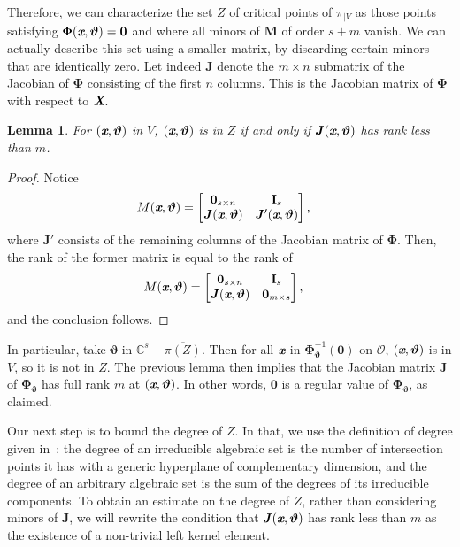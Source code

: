 \documentclass[a4paper]{article}
\def\sO{\mathscr{O}}
\def\Xb{\textit{\textbf{X}}}
\def\thetab{\bm{\vartheta}}
\def\xb{\textit{\textbf{x}}}
\def\dt{s}
\def\C{\mathbb{C}}
\def\bbm{\begin{bmatrix}}
\def\ebm{\end{bmatrix}}
\newtheorem{lemma}[theorem]{Lemma}
\begin{document}
    Therefore, we can characterize the set $Z$ of critical points of
    $\pi_{|V}$ as those points satisfying $\bm\Phi(\xb,\thetab)=\bm 0$ and
    where all minors of $\bm M$ of order $\dt+m$ vanish. We can actually
    describe this set using a smaller matrix, by discarding certain minors
    that are identically zero. Let indeed $\bm J$ denote the $m \times n$
    submatrix of the Jacobian of $\bm\Phi$ consisting of the first $n$
    columns. This is the Jacobian matrix of $\bm \Phi$ with respect to $\Xb$.
    \begin{lemma} 
      For $(\xb,\thetab)$ in $V$, $(\xb,\thetab)$ is in $Z$ if and only if
      $\bm J(\xb,\thetab)$ has rank less than $m$.
    \end{lemma}
    \begin{proof}
    Notice 
    \begin{align*}
    M(\xb,\thetab)&= 
    \bbm 
    \textbf{0}_{\dt \times n} &\textbf{I}_{\dt} \\
    \bm J(\xb,\thetab)     &\bm J'(\xb,\thetab)
    \ebm,
    \end{align*}
    where $\bm J'$ consists of the remaining columns of the Jacobian matrix of
    $\bm\Phi$.  Then, the rank of the former matrix is equal to the rank
    of
    \begin{align*}
    M(\xb,\thetab)&= 
    \bbm 
    \textbf{0}_{\dt \times n} &\textbf{I}_{\dt} \\
    \bm J(\xb,\thetab)     & \bm 0_{m \times s}
    \ebm,
    \end{align*}
    and the conclusion follows.
    \end{proof}

    In particular, take $\thetab$ in $\C^\dt - \overline{\pi(Z)}$.
    Then for all $\xb$ in $\bm \Phi_{\thetab}^{-1}(\bm 0)$ on $\sO$, $(\xb,\thetab)$
    is in $V$, so it is not in $Z$. The previous lemma then implies that
    the Jacobian matrix $\bm J$ of $\bm\Phi_{\thetab}$ has full rank $m$ at
    $(\xb,\thetab)$. In other words, $\bm 0$ is a regular value of $\bm
    \Phi_{\thetab}$, as claimed.
    
    Our next step is to bound the degree of $Z$.  In that, we use the
    definition of degree given in~\cite{H}: the degree of an irreducible
    algebraic set is the number of intersection points it has with a
    generic hyperplane of complementary dimension, and the degree of an
    arbitrary algebraic set is the sum of the degrees of its irreducible
    components.  To obtain an estimate on the degree of $Z$, rather than
    considering minors of $\bm J$, we will rewrite the condition that $\bm
    J(\xb,\thetab)$ has rank less than $m$ as the existence of a
    non-trivial left kernel element.
    
\end{document}
